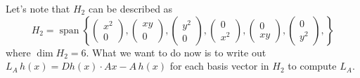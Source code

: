 \documentclass{article}
\begin{document}
Let's note that $H_2$ can be described as 
\[
H_2 = \operatorname{span}\left\{\begin{pmatrix}
x^2\\ 0
\end{pmatrix},\begin{pmatrix}
xy\\ 0
\end{pmatrix},\begin{pmatrix}
y^2\\ 0
\end{pmatrix},\begin{pmatrix}
0\\ x^2
\end{pmatrix},\begin{pmatrix}
0\\ xy
\end{pmatrix},\begin{pmatrix}
0\\ y^2
\end{pmatrix},\right\}
\]
where $\dim H_2=6$. What we want to do now is to write out $L_A\, h(x)=Dh(x)\cdot Ax - A\, h(x)$ for each basis vector in $H_2$ to compute $L_A$.
\end{document}
